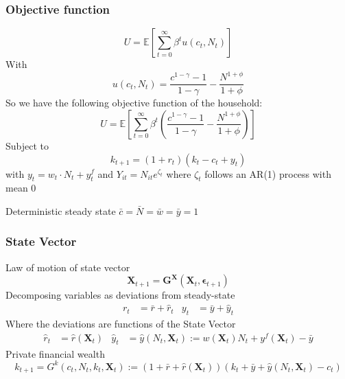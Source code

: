 \documentclass{beamer}
\begin{document}
\subsubsection{Objective function}
\begin{frame}{\subsecname}
    \begin{equation}\tag{3}
        \label{3}
        U = \mathbb{E}\left[\sum_{t=0}^{\infty}\beta^{t}u(c_t,N_t)\right]
    \end{equation}
    With
    \begin{equation*}
    u(c_t,N_t) = \frac{c^{1-\gamma}-1}{1-\gamma}-\frac{N^{1+\phi}}{1+\phi}
    \end{equation*}
    So we have the following objective function of the household: 
    \begin{equation*}
        U = \mathbb{E}\left[\sum_{t=0}^{\infty}\beta^{t}\left(\frac{c^{1-\gamma}-1}{1-\gamma}-\frac{N^{1+\phi}}{1+\phi}\right)\right]
    \end{equation*}
    Subject to 
  \begin{equation}\tag{4}
        k_{t+1}=(1+r_t)(k_t-c_t+y_t)
    \end{equation} 
with $y_t=w_t\cdot N_{t}+y_{t}^{f}$ and $Y_{i t}=N_{i t} e^{\zeta_t}$ where $\zeta_t$ follows an AR(1) process with mean 0

Deterministic steady state $\bar{c}=\bar{N}=\bar{w}=\bar{y}=1$

    
    
\end{frame}

\subsubsection{State Vector}
\begin{frame}{\subsecname}
Law of motion of state vector
\begin{equation}\tag{5}
    \bm{X}_{t+1}=\bm{G}^{\bm{X}}\left(\bm{X}_{t},\bm{\epsilon}_{t+1}\right)
\end{equation}
Decomposing variables as deviations from steady-state
\begin{align*}
    r_{t} &= \bar{r} + \hat{r}_{t} & y_{t} &= \bar{y} + \hat{y}_{t}
\end{align*}
Where the deviations are functions of the State Vector
\begin{align*}
   \hat{r}_{t} &= \hat{r}(\bm{X}_t) & \hat{y}_{t} &= \hat{y}(N_{t},\bm{X}_{t}) := {w}(\bm{X}_{t})N_{t} + y^{f}(\bm{X}_t)- \bar{y}
\end{align*}
Private financial wealth
\begin{equation}\tag{6}
    k_{t+1}=G^{k}(c_{t},N_{t}, k_{t}, \bm{X}_t):= (1+\bar{r}+\hat{r}(\bm{X}_{t}))(k_{t}+\bar{y}+\hat{y}(N_{t},\bm{X}_t)-c_{t})
\end{equation}
\end{frame}
\end{document}
